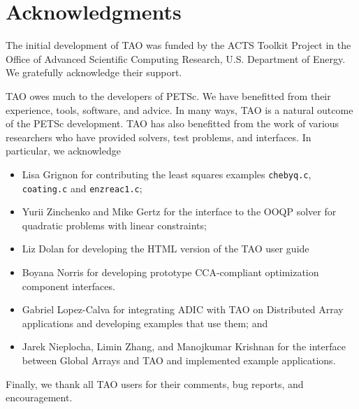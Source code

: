 %
%

\section*{Acknowledgments}

The initial development of TAO was funded by the ACTS Toolkit Project in
the Office of Advanced Scientific Computing Research, U.S. Department
of Energy. We gratefully acknowledge their support.

TAO owes much to the developers of PETSc. We have benefitted
from their experience, tools, software, and advice. In many ways, TAO is a 
natural outcome of the PETSc development.
%
TAO has also benefitted from the work of various researchers
who have provided solvers, test problems, and interfaces.
In particular, we acknowledge

\begin{itemize}
\setlength{\itemsep}{0pt}
\item 
Lisa Grignon for contributing the least squares examples
\texttt{chebyq.c}, \texttt{coating.c}  and \texttt{enzreac1.c};
\item Yurii Zinchenko and Mike Gertz for the interface to
the OOQP solver for quadratic problems with linear constraints;
\item
Liz Dolan for developing the HTML version of the TAO user guide
\item
Boyana Norris for developing prototype CCA-compliant 
optimization component interfaces.
\item Gabriel Lopez-Calva for integrating ADIC with TAO on Distributed
Array applications and developing examples that use them; and
\item Jarek Nieplocha, Limin Zhang, and Manojkumar Krishnan for the
interface between Global Arrays and TAO and implemented example
applications.
\end{itemize}

\noindent
Finally, we thank all TAO users for their comments, bug reports, and
encouragement.

